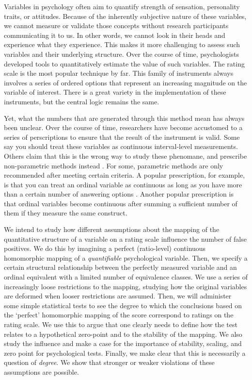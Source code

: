 \documentclass[utf8]{FrontiersinVancouver}
\begin{document}
Variables in psychology often aim to quantify strength of sensation, personality traits, or attitudes. Because of the inherently subjective nature of these variables, we cannot measure or validate those concepts without research participants communicating it to us. In other words, we cannot look in their heads and experience what they experience. This makes it more challenging to assess such variables and their underlying structure. Over the course of time, psychologists developed tools to quantitatively estimate the value of such variables. The rating scale is the most popular technique by far. This family of instruments always involves a series of ordered options that represent an increasing magnitude on the variable of interest. There is a great variety in the implementation of these instruments, but the central logic remains the same. 

Yet, what the numbers that are generated through this method mean has always been unclear. Over the course of time, researchers have become accustomed to a series of perscriptions to ensure that the result of the instrument is valid. Some say you should treat these variables as continuous interval-level measurements. Others claim that this is the wrong way to study these phenomane, and prescribe non-parametric methods instead \citep{knappTreatingOrdinalScales1990}. For some, parametric methods are only recommended after meeting certain criteria. A popular prescription, for example, is that you can treat an ordinal variable as continuous as long as you have more than a certain number of answering options \citep{wuCanLikertScales2017}. Another popular prescription is that ordinal variables become continuous after summing a sufficient number of them if they measure the same construct. 

We intend to study how different assumptions about the mapping of the quantitative structure of a variable on a rating scale influence the number of false positives. We do this by imagining a perfect (ratio-level) continuous homomorphic mapping of a \textit{quantifiable} psychological variable. Then, we specify a certain structural relationship between the perfectly measured variable and an ordinal equivalent with a limited number of equivalence classes. We use a series of increasingly loose restrictions to the mapping, studying how the original variables are deformed when looser restrictions are assumed. Then, we will administer some simple statistical tests to see the degree to which the conclusions based on the `perfect' homomorphic mapping of the score correspond to ratings on the rating scale. We use this to argue that one clearly needs to define how the test relates to a hypothetical zero-point and to the stability of the mapping. We also study the influence and make a case for the importance of stability, scaling, and zero point for psychological tests. Finally, we make clear that this is necessarily a question of \textit{degree}. We show that stronger or weaker violations of these assumptions are possible.
\end{document}
